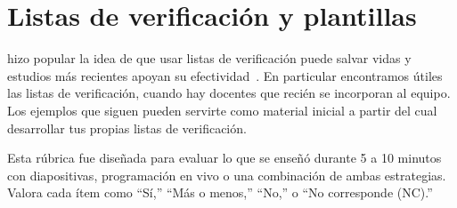 \chapter{Listas de verificación y plantillas}\label{s:checklist}

\cite{Gawa2007} hizo popular la idea de que usar listas de verificación puede salvar vidas
y estudios más recientes apoyan su efectividad~\cite{Avel2013,Urba2014,Rams2019}.
En particular encontramos útiles las listas de verificación,
cuando hay docentes que recién se incorporan al equipo.
Los ejemplos que siguen pueden servirte como material inicial a partir del cual desarrollar tus propias listas de verificación.


Esta rúbrica fue diseñada para evaluar lo que se enseñó durante 5 a 10 minutos
con diapositivas, programación en vivo o una combinación de ambas estrategias.
Valora cada ítem como ``Sí,'' ``Más o menos,'' ``No,'' o ``No corresponde (NC).''

